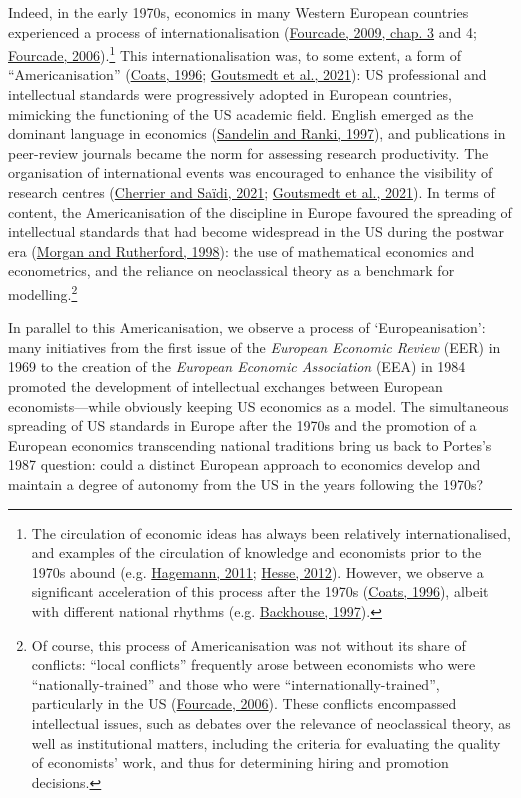 \documentclass[
  12pt,
  onecolumn]{article}
\begin{document}
Indeed, in the early 1970s, economics in many Western European countries experienced a process of internationalisation (\protect\hyperlink{ref-fourcade2009}{Fourcade, 2009, chap. 3} and 4; \protect\hyperlink{ref-fourcade2006}{Fourcade, 2006}).\footnote{The circulation of economic ideas has always been relatively internationalised, and examples of the circulation of knowledge and economists prior to the 1970s abound (e.g. \protect\hyperlink{ref-hagemann2011a}{Hagemann, 2011}; \protect\hyperlink{ref-hesse2012}{Hesse, 2012}). However, we observe a significant acceleration of this process after the 1970s (\protect\hyperlink{ref-coats1996}{Coats, 1996}), albeit with different national rhythms (e.g. \protect\hyperlink{ref-backhouse1997a}{Backhouse, 1997}).} This internationalisation was, to some extent, a form of ``Americanisation'' (\protect\hyperlink{ref-coats1996}{Coats, 1996}; \protect\hyperlink{ref-goutsmedt2021}{Goutsmedt et al., 2021}): US professional and intellectual standards were progressively adopted in European countries, mimicking the functioning of the US academic field. English emerged as the dominant language in economics (\protect\hyperlink{ref-sandelin1997}{Sandelin and Ranki, 1997}), and publications in peer-review journals became the norm for assessing research productivity. The organisation of international events was encouraged to enhance the visibility of research centres (\protect\hyperlink{ref-cherrier2021}{Cherrier and Saïdi, 2021}; \protect\hyperlink{ref-goutsmedt2021}{Goutsmedt et al., 2021}). In terms of content, the Americanisation of the discipline in Europe favoured the spreading of intellectual standards that had become widespread in the US during the postwar era (\protect\hyperlink{ref-morgan1998}{Morgan and Rutherford, 1998}): the use of mathematical economics and econometrics, and the reliance on neoclassical theory as a benchmark for modelling.\footnote{Of course, this process of Americanisation was not without its share of conflicts: ``local conflicts'' frequently arose between economists who were ``nationally-trained'' and those who were ``internationally-trained'', particularly in the US (\protect\hyperlink{ref-fourcade2006}{Fourcade, 2006}). These conflicts encompassed intellectual issues, such as debates over the relevance of neoclassical theory, as well as institutional matters, including the criteria for evaluating the quality of economists' work, and thus for determining hiring and promotion decisions.}

In parallel to this Americanisation, we observe a process of `Europeanisation': many initiatives from the first issue of the \emph{European Economic Review} (EER) in 1969 to the creation of the \emph{European Economic Association} (EEA) in 1984 promoted the development of intellectual exchanges between European economists---while obviously keeping US economics as a model. The simultaneous spreading of US standards in Europe after the 1970s and the promotion of a European economics transcending national traditions bring us back to Portes's 1987 question: could a distinct European approach to economics develop and maintain a degree of autonomy from the US in the years following the 1970s?
\end{document}
